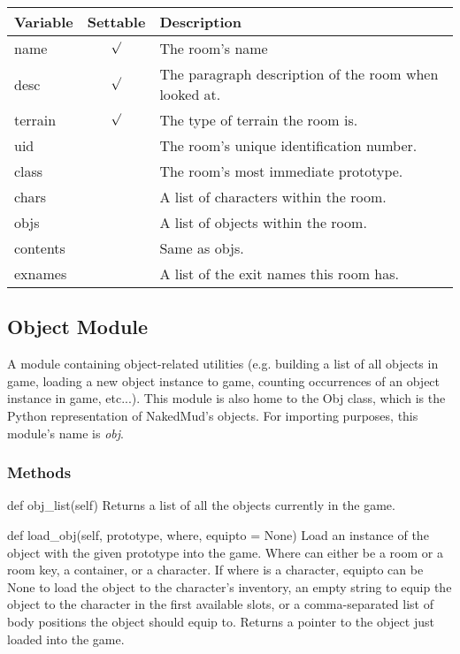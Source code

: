 \documentclass[12pt]{article}
\begin{document}
\begin{tabular}{|l|c|l|}
\hline
Variable & Settable & Description \\
\hline
name    & \begin{math}\surd\end{math} & The room's name \\
desc    & \begin{math}\surd\end{math} & The paragraph description of the room when looked at. \\
terrain & \begin{math}\surd\end{math} & The type of terrain the room is. \\
uid     & & The room's unique identification number. \\
class   & & The room's most immediate prototype. \\
chars   & & A list of characters within the room. \\
objs    & & A list of objects within the room. \\
contents& & Same as objs. \\
exnames & & A list of the exit names this room has. \\
\hline
\end{tabular}


\subsection{Object Module}
A module containing object-related utilities (e.g. building a list of all objects in game, loading a new object instance to game, counting occurrences of an object instance in game, etc...). This module is also home to the Obj class, which is the Python representation of NakedMud's objects. For importing purposes, this module's name is {\it obj}.

\subsubsection{Methods}
def obj\_list(self) \newline
Returns a list of all the objects currently in the game.

def load\_obj(self, prototype, where, equipto = None) \newline
Load an instance of the object with the given prototype into the game. Where can either be a room or a room key, a container, or a character. If where is a character, equipto can be None to load the object to the character's inventory, an empty string to equip the object to the character in the first available slots, or a comma-separated list of body positions the object should equip to. Returns a pointer to the object just loaded into the game.
\end{document}
